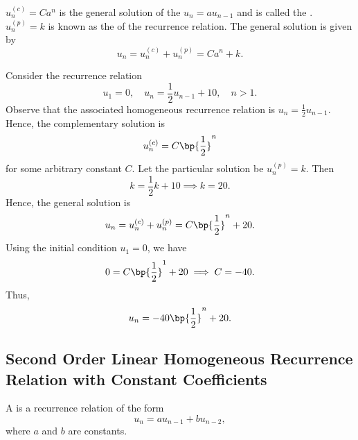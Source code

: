 \begin{fact}
    $u_n^{(c)} = Ca^n$ is the general solution of the  $u_n = au_{n-1}$ and is called the . $u_n^{(p)} = k$ is known as the  of the recurrence relation. The general solution is given by \[u_n = u_n^{(c)} + u_n^{(p)} = Ca^n + k.\]
\end{fact}

\begin{example}
    Consider the recurrence relation \[u_1 = 0, \quad u_n = \frac12 u_{n-1} + 10, \quad n > 1.\] Observe that the associated homogeneous recurrence relation is $u_n = \frac12 u_{n-1}$. Hence, the complementary solution is \[u_n^{(c)} = C\bp{\frac12}^n\] for some arbitrary constant $C$. Let the particular solution be $u_n^{(p)} = k$. Then \[k = \frac12 k + 10 \implies k = 20.\] Hence, the general solution is \[u_n = u_n^{(c)} + u_n^{(p)} = C\bp{\frac12}^n + 20.\] Using the initial condition $u_1 = 0$, we have \[0 = C\bp{\frac12}^1 + 20 \implies C = -40.\] Thus, \[u_n =-40\bp{\frac12}^n + 20.\]
\end{example}

\subsection{Second Order Linear Homogeneous Recurrence Relation with Constant Coefficients}

\begin{definition}
    A  is a recurrence relation of the form \[u_n = a u_{n-1} + b u_{n-2},\] where $a$ and $b$ are constants.
\end{definition}

